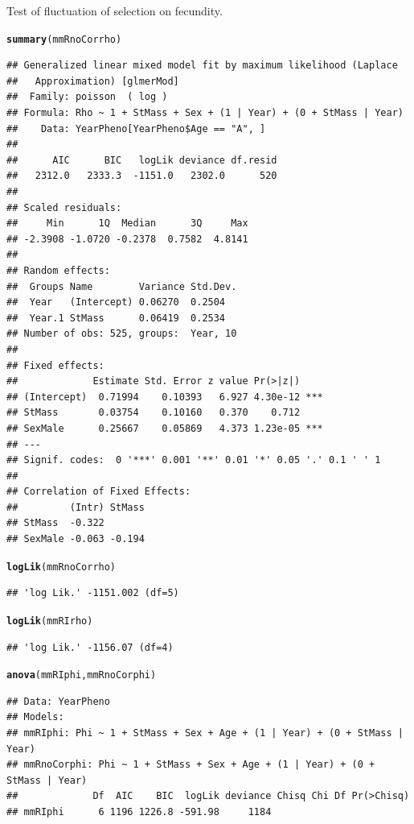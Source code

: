 \documentclass{article}\usepackage[]{graphicx}\usepackage[]{color}
\makeatletter
\newcommand{\hlstd}[1]{\textcolor[rgb]{0.345,0.345,0.345}{#1}}%
\newcommand{\hlkwd}[1]{\textcolor[rgb]{0.737,0.353,0.396}{\textbf{#1}}}%
\newenvironment{kframe}{%
 \def\at@end@of@kframe{}%
 \ifinner\ifhmode%
  \def\at@end@of@kframe{\end{minipage}}%
  \begin{minipage}{\columnwidth}%
 \fi\fi%
 \def\FrameCommand##1{\hskip\@totalleftmargin \hskip-\fboxsep
 \colorbox{shadecolor}{##1}\hskip-\fboxsep
     \hskip-\linewidth \hskip-\@totalleftmargin \hskip\columnwidth}%
 \MakeFramed {\advance\hsize-\width
   \@totalleftmargin\z@ \linewidth\hsize
   \@setminipage}}%
 {\par\unskip\endMakeFramed%
 \at@end@of@kframe}
\newenvironment{knitrout}{}{} %
\makeatother
\begin{document}
Test of fluctuation of selection on fecundity.
\begin{knitrout}
\color{fgcolor}\begin{kframe}
\begin{alltt}
\hlkwd{summary}\hlstd{(mmRnoCorrho)}
\end{alltt}
\begin{verbatim}
## Generalized linear mixed model fit by maximum likelihood (Laplace
##   Approximation) [glmerMod]
##  Family: poisson  ( log )
## Formula: Rho ~ 1 + StMass + Sex + (1 | Year) + (0 + StMass | Year)
##    Data: YearPheno[YearPheno$Age == "A", ]
## 
##      AIC      BIC   logLik deviance df.resid 
##   2312.0   2333.3  -1151.0   2302.0      520 
## 
## Scaled residuals: 
##     Min      1Q  Median      3Q     Max 
## -2.3908 -1.0720 -0.2378  0.7582  4.8141 
## 
## Random effects:
##  Groups Name        Variance Std.Dev.
##  Year   (Intercept) 0.06270  0.2504  
##  Year.1 StMass      0.06419  0.2534  
## Number of obs: 525, groups:  Year, 10
## 
## Fixed effects:
##             Estimate Std. Error z value Pr(>|z|)    
## (Intercept)  0.71994    0.10393   6.927 4.30e-12 ***
## StMass       0.03754    0.10160   0.370    0.712    
## SexMale      0.25667    0.05869   4.373 1.23e-05 ***
## ---
## Signif. codes:  0 '***' 0.001 '**' 0.01 '*' 0.05 '.' 0.1 ' ' 1
## 
## Correlation of Fixed Effects:
##         (Intr) StMass
## StMass  -0.322       
## SexMale -0.063 -0.194
\end{verbatim}
\begin{alltt}
\hlkwd{logLik}\hlstd{(mmRnoCorrho)}
\end{alltt}
\begin{verbatim}
## 'log Lik.' -1151.002 (df=5)
\end{verbatim}
\begin{alltt}
\hlkwd{logLik}\hlstd{(mmRIrho)}
\end{alltt}
\begin{verbatim}
## 'log Lik.' -1156.07 (df=4)
\end{verbatim}
\begin{alltt}
\hlkwd{anova}\hlstd{(mmRIphi,mmRnoCorphi)}
\end{alltt}
\begin{verbatim}
## Data: YearPheno
## Models:
## mmRIphi: Phi ~ 1 + StMass + Sex + Age + (1 | Year) + (0 + StMass | Year)
## mmRnoCorphi: Phi ~ 1 + StMass + Sex + Age + (1 | Year) + (0 + StMass | Year)
##             Df  AIC    BIC  logLik deviance Chisq Chi Df Pr(>Chisq)
## mmRIphi      6 1196 1226.8 -591.98     1184                        

\end{verbatim}
\end{kframe}
\end{knitrout}
\end{document}
